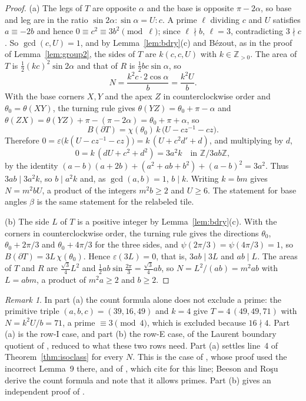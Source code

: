 \documentclass[11pt]{amsart}
\theoremstyle{remark}
\newtheorem{remark}[theorem]{Remark}
\newcommand{\Z}{\mathbb{Z}}
\begin{document}
\begin{proof}
(a) The legs of $T$ are opposite $\alpha$ and the base is opposite $\pi-2\alpha$, so base and leg are in the ratio $\sin2\alpha:\sin\alpha=U:c$. A prime $\ell$ dividing $c$ and $U$ satisfies $a\equiv-2b$ and hence $0\equiv c^2\equiv 3b^2\pmod\ell$; since $\ell\nmid b$, $\ell=3$, contradicting $3\nmid c$. So $\gcd(c,U)=1$, and by Lemma~\ref{lem:bdry}(c) and B\'ezout, as in the proof of Lemma~\ref{lem:group2}, the sides of $T$ are $k(c,c,U)$ with $k\in\Z_{>0}$. The area of $T$ is $\tfrac12(kc)^2\sin2\alpha$ and that of $R$ is $\tfrac12bc\sin\alpha$, so
\[
N=\frac{k^2c\cdot2\cos\alpha}{b}=\frac{k^2U}{b}.
\]
With the base corners $X,Y$ and the apex $Z$ in counterclockwise order and $\theta_0=\theta(XY)$, the turning rule gives $\theta(YZ)=\theta_0+\pi-\alpha$ and $\theta(ZX)=\theta(YZ)+\pi-(\pi-2\alpha)=\theta_0+\pi+\alpha$, so
\[
B(\partial T)=\chi(\theta_0)\,k\,\bigl(U-cz^{-1}-cz\bigr).
\]
Therefore $0=\varepsilon\bigl(k(U-cz^{-1}-cz)\bigr)=k\,(U+c^2d'+d)$, and multiplying by $d$,
\[
0=k\,(dU+c^2+d^2)=3a^2k\quad\text{in }\Z/3ab\Z,
\]
by the identity $(a-b)(a+2b)+(a^2+ab+b^2)+(a-b)^2=3a^2$. Thus $3ab\mid3a^2k$, so $b\mid a^2k$ and, as $\gcd(a,b)=1$, $b\mid k$. Writing $k=bm$ gives $N=m^2bU$, a product of the integers $m^2b\ge2$ and $U\ge6$. The statement for base angles $\beta$ is the same statement for the relabeled tile.

(b) The side $L$ of $T$ is a positive integer by Lemma~\ref{lem:bdry}(c). With the corners in counterclockwise order, the turning rule gives the directions $\theta_0$, $\theta_0+2\pi/3$ and $\theta_0+4\pi/3$ for the three sides, and $\psi(2\pi/3)=\psi(4\pi/3)=1$, so $B(\partial T)=3L\,\chi(\theta_0)$. Hence $\varepsilon(3L)=0$, that is, $3ab\mid 3L$ and $ab\mid L$. The areas of $T$ and $R$ are $\tfrac{\sqrt3}{4}L^2$ and $\tfrac12ab\sin\tfrac{2\pi}{3}=\tfrac{\sqrt3}{4}ab$, so $N=L^2/(ab)=m^2ab$ with $L=abm$, a product of $m^2a\ge2$ and $b\ge2$.
\end{proof}

\begin{remark}
In part (a) the count formula alone does not exclude a prime: the primitive triple $(a,b,c)=(39,16,49)$ and $k=4$ give $T=4\,(49,49,71)$ with $N=k^2U/b=71$, a prime $\equiv3\pmod4$, which is excluded because $16\nmid4$. Part (a) is the row-I case, and part (b) the row-E case, of the Laurent boundary quotient of \cite[Theorem~19 and Corollary~22]{Progress634}, reduced to what these two rows need. Part (a) settles line~4 of Theorem~\ref{thm:isoclass} for every $N$. This is the case of \cite[Theorem~10]{BeesonPrime}, whose proof used the incorrect Lemma~9 there, and of \cite[Theorem~42]{Bonfioli1}, which \cite[Section~2 and Corollary~8]{BR} cite for this line; Beeson and Ro\c{s}u \cite[Section~8]{BR} derive the count formula and note that it allows primes. Part (b) gives an independent proof of \cite[Theorem~6]{BeesonEqui}.
\end{remark}
\end{document}

